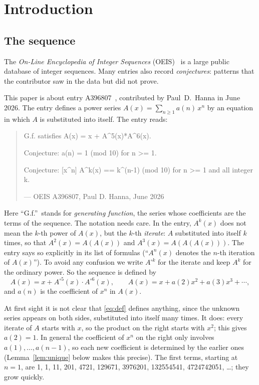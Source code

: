 \documentclass[11pt,a4paper]{article}
\theoremstyle{definition}
\theoremstyle{remark}
\begin{document}
\section{Introduction}

\subsection{The sequence}\label{sec:sequence}
The \emph{On-Line Encyclopedia of Integer Sequences} (OEIS)~\cite{oeisdb} is a large public database of integer
sequences. Many
entries also record \emph{conjectures}: patterns that the contributor saw in the data but did not prove.

This paper is about entry A396807~\cite{oeis}, contributed by Paul~D.~Hanna in June 2026.
The entry defines a power series $A(x)=\sum_{n\ge1}a(n)\,x^n$ by an equation in which $A$ is substituted into
itself. The entry reads:
\begin{quote}\small\ttfamily\raggedright G.f. satisfies A(x) = x + A\^{}5(x)*A\^{}6(x).\par\smallskip Conjecture: a(n) = 1 (mod 10) for n >= 1.\par\smallskip Conjecture: [x\^{}n] A\^{}k(x) == k\^{}(n-1) (mod 10) for n >= 1 and all integer k.\par\smallskip\hfill\textrm{--- OEIS A396807, Paul D. Hanna, June 2026}\end{quote}

Here ``G.f.''\ stands for \emph{generating function}, the series whose coefficients are the terms of the sequence.
The notation needs care. In the entry, $A^k(x)$ does not mean the $k$-th power of $A(x)$, but the $k$-th
\emph{iterate}: $A$ substituted into itself $k$ times, so that $A^2(x)=A(A(x))$ and $A^3(x)=A(A(A(x)))$. The entry
says so explicitly in its list of formulas (``$A^n(x)$ denotes the $n$-th iteration of $A(x)$''). To avoid any
confusion we write $A^{\circ k}$ for the iterate and keep $A^k$ for the ordinary power. So the sequence is defined by
\begin{equation}\label{eq:def}
A(x)=x+A^{\circ5}(x)\cdot A^{\circ6}(x),\qquad A(x)=x+a(2)x^2+a(3)x^3+\cdots,
\end{equation}
and $a(n)$ is the coefficient of $x^n$ in $A(x)$.

At first sight it is not clear that \eqref{eq:def} defines anything, since the unknown series appears on both sides,
substituted into itself many times. It does: every iterate
of $A$ starts with $x$, so the product on the right starts with $x^2$; this gives $a(2)=1$. In general the
coefficient of $x^n$ on the right only involves $a(1),\dots,a(n-1)$, so each new coefficient is determined by the
earlier ones (Lemma~\ref{lem:unique} below makes this precise). The first terms, starting at $n=1$, are
1, 1, 11, 201, 4721, 129671, 3976201, 132554541, 4724742051, \dots; they grow quickly.
\end{document}
